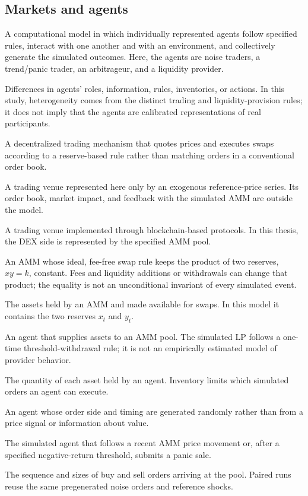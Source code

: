 \subsection*{Markets and agents}
\begin{description}[style=unboxed,leftmargin=0pt,labelwidth=0pt,labelsep=0.5em,itemsep=0.1em]
  \item[ABM --- agent-based model:] A computational model in which individually represented agents follow specified rules, interact with one another and with an environment, and collectively generate the simulated outcomes. Here, the agents are noise traders, a trend/panic trader, an arbitrageur, and a liquidity provider.
  \item[Agent heterogeneity:] Differences in agents' roles, information, rules, inventories, or actions. In this study, heterogeneity comes from the distinct trading and liquidity-provision rules; it does not imply that the agents are calibrated representations of real participants.
  \item[AMM --- automated market maker:] A decentralized trading mechanism that quotes prices and executes swaps according to a reserve-based rule rather than matching orders in a conventional order book.
  \item[CEX --- centralized exchange:] A trading venue represented here only by an exogenous reference-price series. Its order book, market impact, and feedback with the simulated AMM are outside the model.
  \item[DEX --- decentralized exchange:] A trading venue implemented through blockchain-based protocols. In this thesis, the DEX side is represented by the specified AMM pool.
  \item[CPMM --- constant-product market maker:] An AMM whose ideal, fee-free swap rule keeps the product of two reserves, $xy=k$, constant. Fees and liquidity additions or withdrawals can change that product; the equality is not an unconditional invariant of every simulated event.
  \item[Liquidity pool:] The assets held by an AMM and made available for swaps. In this model it contains the two reserves $x_t$ and $y_t$.
  \item[Liquidity provider (LP):] An agent that supplies assets to an AMM pool. The simulated LP follows a one-time threshold-withdrawal rule; it is not an empirically estimated model of provider behavior.
  \item[Inventory:] The quantity of each asset held by an agent. Inventory limits which simulated orders an agent can execute.
  \item[Noise trader:] An agent whose order side and timing are generated randomly rather than from a price signal or information about value.
  \item[Trend/panic trader:] The simulated agent that follows a recent AMM price movement or, after a specified negative-return threshold, submits a panic sale.
  \item[Order flow:] The sequence and sizes of buy and sell orders arriving at the pool. Paired runs reuse the same pregenerated noise orders and reference shocks.
\end{description}

